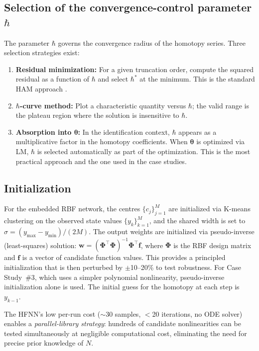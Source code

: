 \documentclass[preprint,12pt]{elsarticle}
\begin{document}
\subsection{Selection of the convergence-control parameter $\hbar$}
\label{sec:hbar}
The parameter $\hbar$ governs the convergence radius of the homotopy series. Three selection strategies exist:
\begin{enumerate}
\item[(a)] \textbf{Residual minimization:} For a given truncation order, compute the squared residual as a function of $\hbar$ and select $\hbar^*$ at the minimum. This is the standard HAM approach \cite{liao2003}.
\item[(b)] \textbf{$\hbar$-curve method:} Plot a characteristic quantity versus $\hbar$; the valid range is the plateau region where the solution is insensitive to $\hbar$.
\item[(c)] \textbf{Absorption into $\boldsymbol{\theta}$:} In the identification context, $\hbar$ appears as a multiplicative factor in the homotopy coefficients. When $\boldsymbol{\theta}$ is optimized via LM, $\hbar$ is selected automatically as part of the optimization. This is the most practical approach and the one used in the case studies.
\end{enumerate}

\subsection{Initialization}
\label{sec:initialization}
For the embedded RBF network, the centres $\{c_j\}_{j=1}^M$ are initialized via K-means clustering on the observed state values $\{y_k\}_{k=1}^M$, and the shared width is set to $\sigma = (y_{\max} - y_{\min})/(2M)$. The output weights are initialized via pseudo-inverse (least-squares) solution: $\mathbf{w} = (\boldsymbol{\Phi}^\top\boldsymbol{\Phi})^{-1}\boldsymbol{\Phi}^\top\mathbf{f}$, where $\boldsymbol{\Phi}$ is the RBF design matrix and $\mathbf{f}$ is a vector of candidate function values. This provides a principled initialization that is then perturbed by $\pm$10--20\% to test robustness. For Case Study~\#3, which uses a simpler polynomial nonlinearity, pseudo-inverse initialization alone is used. The initial guess for the homotopy at each step is $y_{k-1}$.

The HFNN's low per-run cost ($\sim$30 samples, $<$20 iterations, no ODE solver) enables a \emph{parallel-library strategy}: hundreds of candidate nonlinearities can be tested simultaneously at negligible computational cost, eliminating the need for precise prior knowledge of $N$.
\end{document}
